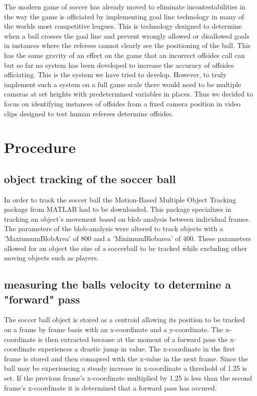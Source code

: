 \documentclass[letterpaper, 10 pt, conference]{ieeeconf}  %
\begin{document}
The modern game of soccer has already moved to eliminate incontestabilities in the way the game is officiated by implementing goal line technology in many of the worlds most competitive leagues. This is technology designed to determine when a ball crosses the goal line and prevent wrongly allowed or disallowed goals in instances where the referees cannot clearly see the positioning of the ball. This has the same gravity of an effect on the game that an incorrect offsides call can but so far no system has been developed to increase the accuracy of offsides officiating. This is the system we have tried to develop. However, to truly implement such a system on a full game scale there would need to be multiple cameras at set heights with predetermined variables in places. Thus we decided to focus on identifying instances of offsides from a fixed camera position in video clips designed to test human referees determine offsides. 


\section{Procedure}

\subsection{object tracking of the soccer ball}

In order to track the soccer ball the Motion-Based Multiple Object Tracking package from MATLAB had to be downloaded. This package specializes in tracking an object's movement based on blob analysis between individual frames. The parameters of the blob-analysis were altered to track objects with a 'MaxiumumBlobArea' of 800 and a 'MinimumBlobarea' of 400. These parameters allowed for an object the size of a soccerball to be tracked while excluding other moving objects such as players. 


\subsection{measuring the balls velocity to determine a "forward" pass}

The soccer ball object is stored as a centroid allowing its position to be tracked on a frame by frame basis with an x-coordinate and a y-coordinate. The x-coordinate is then extracted because at the moment of a forward pass the x-coordinate experiences a drastic jump in value. The x-coordinate in the first frame is stored and then comapred with the x-value in the next frame. Since the ball may be experiencing a steady increase in x-coordinate a threshold of 1.25 is set. If the previous frame's x-coordinate multiplied by 1.25 is less than the second frame's x-coordinate it is determined that a forward pass has occured. 
\end{document}
